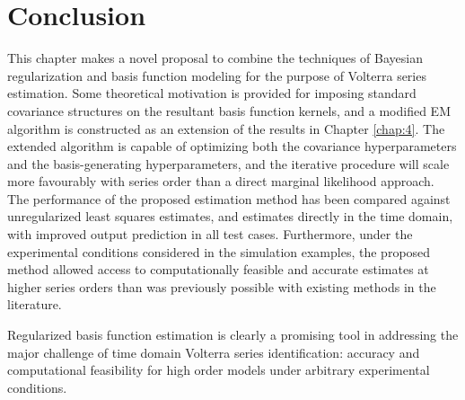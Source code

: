 \section{Conclusion}

This chapter makes a novel proposal to combine the techniques of Bayesian regularization and basis function modeling for the purpose of Volterra series estimation. Some theoretical motivation is provided for imposing standard covariance structures on the resultant basis function kernels, and a modified EM algorithm is constructed as an extension of the results in Chapter \ref{chap:4}. The extended algorithm is capable of optimizing both the covariance hyperparameters and the basis-generating hyperparameters, and the iterative procedure will scale more favourably with series order than a direct marginal likelihood approach. The performance of the proposed estimation method has been compared against unregularized least squares estimates, and estimates directly in the time domain, with improved output prediction in all test cases. Furthermore, under the experimental conditions considered in the simulation examples, the proposed method allowed access to computationally feasible and accurate estimates at higher series orders than was previously possible with existing methods in the literature. 

Regularized basis function estimation is clearly a promising tool in addressing the major challenge of time domain Volterra series identification: accuracy and computational feasibility for high order models under arbitrary experimental conditions. 


